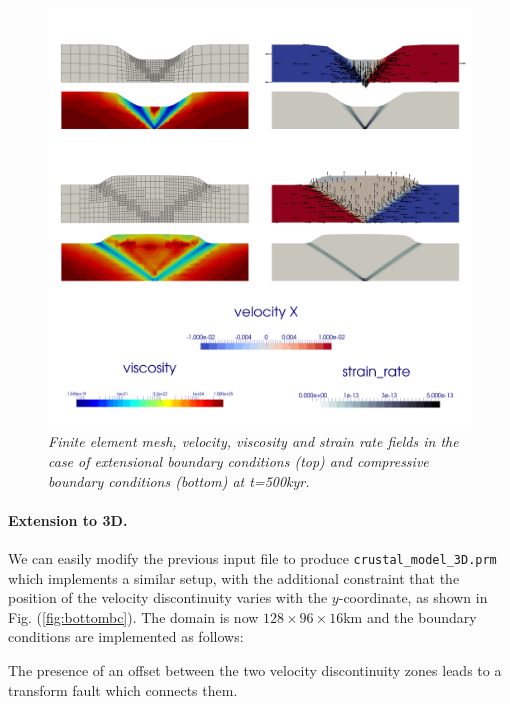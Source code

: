 \begin{figure}
  \centering
  \includegraphics[width=\textwidth]{cookbooks/crustal_deformation/doc/both.png}
  \caption{\it Finite element mesh, velocity, viscosity and strain rate fields
  in the case of extensional boundary conditions (top) and compressive boundary conditions (bottom) at t=500kyr.}
  \label{fig:extcompr}
\end{figure}



\paragraph{Extension to 3D.} We can easily modify the previous
input file to produce {\tt crustal\_model\_3D.prm}
which implements a similar setup, with the additional constraint that the position
of the velocity discontinuity varies with the $y$-coordinate,
as shown in Fig. (\ref{fig:bottombc}).
The domain is now
$128\times96\times16$km and the boundary conditions are implemented as
follows:



The presence of
an offset between the two velocity discontinuity zones leads to a transform
fault which connects them.

